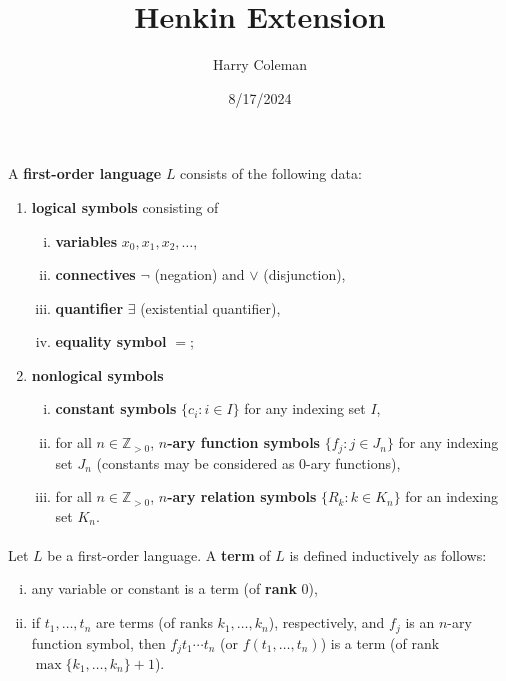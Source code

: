 \documentclass[12pt]{article}
\renewcommand{\maketitle}{\thispagestyle{title}}
\newlength{\myparskip}
\newenvironment{fullbox}{\begin{lrbox}{\savefullbox}\begin{minipage}{\dimexpr\textwidth-2\fboxsep\relax}\setlength{\parskip}{\myparskip}}{\end{minipage}\end{lrbox}\framebox[\textwidth]{\usebox{\savefullbox}}}
\newenvironment{pbox}[1][]{\begin{fullbox}\def\temp{#1}\ifx\temp\empty\else\paragraph{#1}\phantom{}\fi}{\end{fullbox}}
\theoremstyle{definition}
\newcommand{\Z}{\mathbb{Z}}
\newcommand{\<}{\langle}
\renewcommand{\>}{\rangle}
\newcommand{\keyword}{\textbf}
\begin{document}
\title{Henkin Extension}
\author{Harry Coleman}
\date{8/17/2024}
\maketitle



\newpage

\begin{pbox}
    A \keyword{first-order language} $L$ consists of the following data:
    \begin{enumerate}[(1)]
        \item \keyword{logical symbols} consisting of
            \begin{enumerate}[(i)]
                \item \keyword{variables} $x_0, x_1, x_2, \dots$,
                \item \keyword{connectives} $\lnot$ (negation) and $\lor$ (disjunction),
                \item \keyword{quantifier} $\exists$ (existential quantifier),
                \item \keyword{equality symbol} $=$;
            \end{enumerate}
        \item \keyword{nonlogical symbols}
            \begin{enumerate}[(i)]
                \item \keyword{constant symbols} $\{c_i : i \in I\}$ for any indexing set $I$,
                \item for all $n \in \Z_{>0}$, \keyword{$n$-ary function symbols} $\{f_j : j \in J_n\}$ for any indexing set $J_n$ (constants may be considered as $0$-ary functions),
                \item for all $n \in \Z_{>0}$, \keyword{$n$-ary relation symbols} $\{R_k : k \in K_n\}$ for an indexing set $K_n$.
            \end{enumerate}
    \end{enumerate}
\end{pbox}

\begin{pbox}
    Let $L$ be a first-order language.
    A \keyword{term} of $L$ is defined inductively as follows:
    \begin{enumerate}[(i)]
        \item any variable or constant is a term (of \keyword{rank} $0$),
        \item if $t_1, \dots, t_n$ are terms (of ranks $k_1, \dots, k_n$), respectively, and $f_j$ is an $n$-ary function symbol, then $f_j t_1 \cdots t_n$ (or $f(t_1, \dots, t_n)$) is a term (of rank $\max\{k_1, \dots, k_n\} + 1$).
    \end{enumerate}
\end{pbox}
\end{document}
